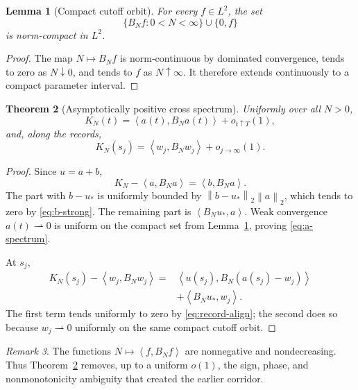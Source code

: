 \documentclass[11pt]{article}
\newtheorem{theorem}{Theorem}
\newtheorem{lemma}[theorem]{Lemma}
\theoremstyle{remark}
\newtheorem{remark}[theorem]{Remark}
\newcommand{\norm}[1]{\left\|#1\right\|}
\newcommand{\ip}[2]{\left\langle#1,#2\right\rangle}
\newcommand{\weakto}{\rightharpoonup}
\begin{document}
\begin{lemma}[Compact cutoff orbit]
\label{lem:cutoff-orbit}
For every \(f\in L^2\), the set
\[
 \{B_Nf:0<N<\infty\}\cup\{0,f\}
\]
is norm-compact in \(L^2\).
\end{lemma}

\begin{proof}
The map \(N\mapsto B_Nf\) is norm-continuous by dominated convergence,
tends to zero as \(N\downarrow0\), and tends to \(f\) as
\(N\uparrow\infty\).  It therefore extends continuously to a compact
parameter interval.
\end{proof}

\begin{theorem}[Asymptotically positive cross spectrum]
\label{thm:positive-spectrum}
Uniformly over all \(N>0\),
\begin{equation}
\label{eq:a-spectrum}
 K_N(t)=\ip{a(t)}{B_Na(t)}+o_{t\uparrow T}(1),
\end{equation}
and, along the records,
\begin{equation}
\label{eq:w-spectrum}
 K_N(s_j)=\ip{w_j}{B_Nw_j}+o_{j\to\infty}(1).
\end{equation}
\end{theorem}

\begin{proof}
Since \(u=a+b\),
\[
 K_N-\ip{a}{B_Na}=\ip{b}{B_Na}.
\]
The part with \(b-u_*\) is uniformly bounded by
\(\norm{b-u_*}_2\norm a_2\), which tends to zero by
\eqref{eq:b-strong}.  The remaining part is
\(\ip{B_Nu_*}{a}\).  Weak convergence \(a(t)\weakto0\) is uniform on
the compact set from Lemma~\ref{lem:cutoff-orbit}, proving
\eqref{eq:a-spectrum}.

At \(s_j\),
\[
\begin{aligned}
 K_N(s_j)-\ip{w_j}{B_Nw_j}
 ={}&
 \ip{u(s_j)}{B_N(a(s_j)-w_j)}\\
 &+\ip{B_Nu_*}{w_j}.
\end{aligned}
\]
The first term tends uniformly to zero by
\eqref{eq:record-align}; the second does so because
\(w_j\weakto0\) uniformly on the same compact cutoff orbit.
\end{proof}

\begin{remark}
The functions \(N\mapsto\ip f{B_Nf}\) are nonnegative and
nondecreasing.  Thus Theorem~\ref{thm:positive-spectrum} removes, up to
a uniform \(o(1)\), the sign, phase, and nonmonotonicity ambiguity that
created the earlier corridor.
\end{remark}
\end{document}
